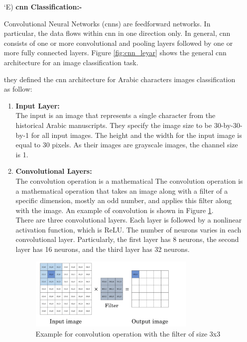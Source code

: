 \begin{itemize}[labelindent=1em,labelsep=0.25cm,leftmargin=*]
        
        \item[\char `E)] \textbf{\acrshort{cnn} Classification:-}
        
        Convolutional Neural Networks (\acrshort{cnn}s) are feedforward networks. In particular, the data flows within \acrshort{cnn} in one direction only. In general, \acrshort{cnn} consists of one or more convolutional and pooling layers followed by one or more fully connected layers. Figure \ref{fig:cnn_leyar} shows the general \acrshort{cnn} architecture for an image classification task.
        
        they defined the \acrshort{cnn} architecture for Arabic characters images classification as follow:
        \begin{enumerate}
        \item {\textbf{Input Layer:}}\\
       The input is an image that represents a single character from the historical Arabic manuscripts. They specify the image size to be 30-by-30-by-1 for all input images. The height and the width for the input image is equal to 30 pixels. As their images are grayscale images, the channel size is 1.
       
        \item {\textbf{Convolutional Layers:}}\\
        The convolution operation is a mathematical The convolution operation is a mathematical operation that takes an image along with a filter of a specific dimension, mostly an odd number, and applies this filter along with the image. An example of convolution is shown in Figure \ref{fig:cnn-onvolution}. \\
        
        There are three convolutional layers. Each layer is followed by a
        nonlinear activation function, which is ReLU. The number of neurons varies in each convolutional layer. Particularly, the first layer has 8 neurons, the second layer has 16 neurons, and the third layer has 32 neurons.
        
        \begin{figure}[!htb]
        \centering
        \includegraphics[width=8cm]{images/cnn-convolution.png}
        \caption{Example for convolution operation with the filter of size 3x3}
        \label{fig:cnn-onvolution}
        \end{figure}
        

\end{enumerate}
\end{itemize}
